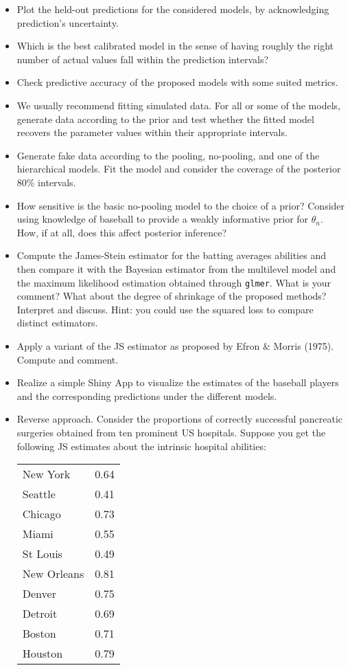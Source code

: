 \begin{itemize}
\item Plot the held-out predictions for the considered models, by acknowledging prediction's uncertainty.
\item Which is the best calibrated model in the sense of having roughly the right number of actual values fall within the prediction intervals? 
\item Check predictive accuracy of the proposed models with some suited metrics.
\item We usually recommend fitting simulated data. For all or some of the models, generate data according to the prior and test whether the fitted model recovers the parameter values within their appropriate intervals.
\item Generate fake data according to the pooling, no-pooling, and one of the hierarchical models. Fit the model and consider the coverage of the posterior 80\% intervals.
\item How sensitive is the basic no-pooling model to the choice of a prior? Consider using knowledge of baseball to provide a weakly informative prior for $\theta_n$. How, if at all, does this affect posterior inference?
\item Compute the James-Stein estimator for the batting averages abilities and then compare it with the Bayesian estimator from the multilevel model and the maximum likelihood estimation obtained through \texttt{glmer}. What is your comment? What about the degree of shrinkage of the proposed methods? Interpret and discuss. Hint: you could use the squared loss to compare distinct estimators.
\item Apply a variant of the JS estimator as proposed by Efron \& Morris (1975). Compute and comment.
\item Realize a simple Shiny App to visualize the estimates of the baseball players and the corresponding predictions under the different models.
\item Reverse approach. Consider the proportions of correctly successful pancreatic surgeries obtained from ten prominent US hospitals. Suppose you get the following JS estimates about the intrinsic hospital abilities:

\begin{tabular}{lc}
New York & 0.64 \\
Seattle  & 0.41\\
Chicago  & 0.73 \\
Miami &  0.55 \\
St Louis &  0.49 \\
New Orleans &   0.81 \\
Denver &  0.75 \\
Detroit &  0.69 \\
Boston &  0.71   \\
Houston & 0.79 \\
\end{tabular}


\end{itemize}
